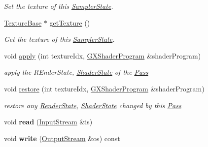 \begin{DoxyCompactItemize}
\begin{DoxyCompactList}\small\item\em Set the texture of this \hyperlink{class_i_dream_sky_1_1_material_1_1_sampler_state}{Sampler\+State}. \end{DoxyCompactList}\item 
\hyperlink{class_i_dream_sky_1_1_texture_base}{Texture\+Base} $\ast$ \hyperlink{class_i_dream_sky_1_1_material_1_1_sampler_state_a2f3591af293e42bff7ee97cd5b66607f}{get\+Texture} ()
\begin{DoxyCompactList}\small\item\em Get the texture of this \hyperlink{class_i_dream_sky_1_1_material_1_1_sampler_state}{Sampler\+State}. \end{DoxyCompactList}\item 
void \hyperlink{class_i_dream_sky_1_1_material_1_1_sampler_state_a911ad0ef9f7cf8dbc7425652ecf89359}{apply} (int texture\+Idx, \hyperlink{class_i_dream_sky_1_1_g_x_shader_program}{G\+X\+Shader\+Program} \&shader\+Program)\hypertarget{class_i_dream_sky_1_1_material_1_1_sampler_state_a911ad0ef9f7cf8dbc7425652ecf89359}{}\label{class_i_dream_sky_1_1_material_1_1_sampler_state_a911ad0ef9f7cf8dbc7425652ecf89359}

\begin{DoxyCompactList}\small\item\em apply the R\+Ender\+State, \hyperlink{class_i_dream_sky_1_1_material_1_1_shader_state}{Shader\+State} of the \hyperlink{class_i_dream_sky_1_1_material_1_1_pass}{Pass} \end{DoxyCompactList}\item 
void \hyperlink{class_i_dream_sky_1_1_material_1_1_sampler_state_ab86b3a3a8483abe566a9bfe05d29f856}{restore} (int texture\+Idx, \hyperlink{class_i_dream_sky_1_1_g_x_shader_program}{G\+X\+Shader\+Program} \&shader\+Program)\hypertarget{class_i_dream_sky_1_1_material_1_1_sampler_state_ab86b3a3a8483abe566a9bfe05d29f856}{}\label{class_i_dream_sky_1_1_material_1_1_sampler_state_ab86b3a3a8483abe566a9bfe05d29f856}

\begin{DoxyCompactList}\small\item\em restore any \hyperlink{class_i_dream_sky_1_1_material_1_1_render_state}{Render\+State}, \hyperlink{class_i_dream_sky_1_1_material_1_1_shader_state}{Shader\+State} changed by this \hyperlink{class_i_dream_sky_1_1_material_1_1_pass}{Pass} \end{DoxyCompactList}\item 
void {\bfseries read} (\hyperlink{class_i_dream_sky_1_1_input_stream}{Input\+Stream} \&is)\hypertarget{class_i_dream_sky_1_1_material_1_1_sampler_state_a93a8ab16558f205122744cf587d3f423}{}\label{class_i_dream_sky_1_1_material_1_1_sampler_state_a93a8ab16558f205122744cf587d3f423}

\item 
void {\bfseries write} (\hyperlink{class_i_dream_sky_1_1_output_stream}{Output\+Stream} \&os) const \hypertarget{class_i_dream_sky_1_1_material_1_1_sampler_state_abeab7142d4b1b5757d7d9d69ee984210}{}\label{class_i_dream_sky_1_1_material_1_1_sampler_state_abeab7142d4b1b5757d7d9d69ee984210}

\end{DoxyCompactItemize}
